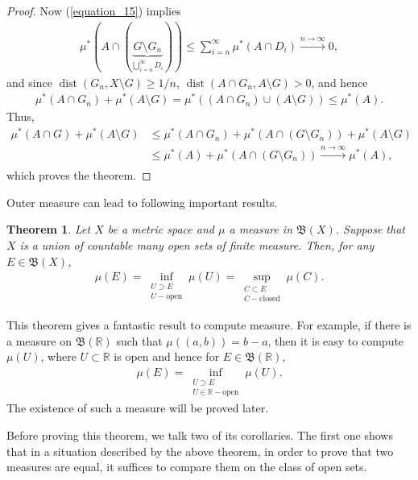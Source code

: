 \documentclass[11pt]{book}
\newtheorem{theorem}{Theorem}[chapter]
\theoremstyle{definition}
\numberwithin{equation}{chapter}
\begin{document}
\begin{proof}
Now (\ref{equation_15}) implies
\begin{align*}
    \mu^*(A \cap (\underbrace{G \setminus G_n}_{\bigcup^\infty_{i=n}D_i})) \leq \sum^\infty_{i=n} \mu^*(A \cap D_i) \xrightarrow[]{n \to \infty} 0,
\end{align*}
and since $\operatorname{dist}(G_n, X \setminus G) \geq 1/n$, $\operatorname{dist}(A \cap G_n, A\setminus G) > 0$, and hence
\begin{align*}
    \mu^*(A \cap G_n) + \mu^*(A\setminus G) = \mu^*((A \cap G_n) \cup (A\setminus G)) \leq \mu^*(A).
\end{align*}
Thus,
\begin{align*}
    \mu^*(A \cap G) + \mu^*(A\setminus G) & \leq \mu^*(A \cap G_n) + \mu^*(A \cap (G \setminus G_n)) + \mu^*(A\setminus G) \\
    & \leq \mu^*(A) + \mu^*(A \cap (G \setminus G_n)) \xrightarrow[]{n \to \infty} \mu^*(A),
\end{align*}
which proves the theorem.
\end{proof}

\medskip

Outer measure can lead to following important results.

\medskip

\begin{theorem}\label{theorem_114}
Let $X$ be a metric space and $\mu$ a measure in $\mathfrak{B}(X)$. Suppose that $X$ is a union of countable many open sets of finite measure. Then, for any $E \in \mathfrak{B}(X)$, 
\begin{align*}
    \mu(E) = \inf_{\substack{U \supset E\\ U - \text{open}}} \mu(U) = \sup_{\substack{C \subset E\\ C - \text{closed}}} \mu(C).
\end{align*}
\end{theorem}


This theorem gives a fantastic result to compute measure. For example, if there is a measure on $\mathfrak{B}(\mathbb{R})$ such that $\mu((a,b)) = b - a$, then it is easy to compute $\mu(U)$, where $U \subset \mathbb{R}$ is open and hence for $E \in \mathfrak{B}(\mathbb{R})$,
\begin{align*}
    \mu(E) = \inf_{\substack{U \supset E\\ U \in \mathbb{R} - \text{open}}} \mu(U).
\end{align*}
The existence of such a measure will be proved later.

Before proving this theorem, we talk two of its corollaries. The first one shows that in a situation described by the above theorem, in order to prove that two measures are equal, it suffices to compare them on the class of open sets.
\end{document}
